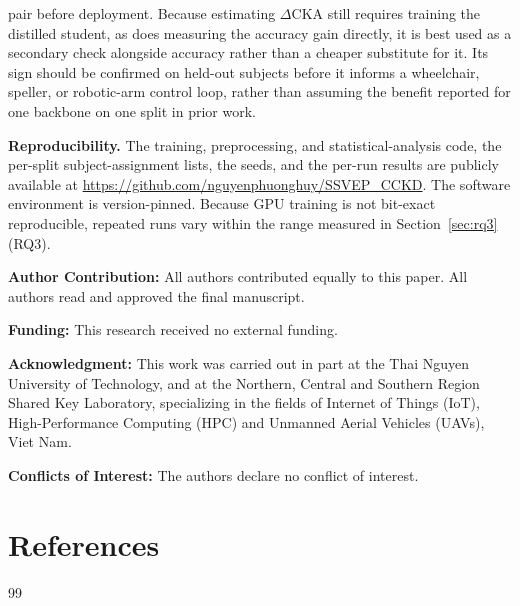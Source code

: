 \documentclass[11pt,a4paper,twoside,asymmetric]{article}
\begin{document}
pair before deployment. Because estimating $\Delta$CKA still requires training the distilled student, as does measuring the accuracy gain directly, it is best used as a secondary check alongside accuracy rather than a cheaper substitute for it. Its sign should be confirmed on held-out subjects before it informs a wheelchair, speller, or robotic-arm control loop, rather than assuming the benefit reported for one backbone on one split in prior work.

\begin{sloppypar}
\noindent \textbf{Reproducibility.} The training, preprocessing, and statistical-analysis code, the per-split subject-assignment lists, the seeds, and the per-run results are publicly available at \url{https://github.com/nguyenphuonghuy/SSVEP_CCKD}. The software environment is version-pinned. Because GPU training is not bit-exact reproducible, repeated runs vary within the range measured in Section~\ref{sec:rq3} (RQ3).
\end{sloppypar}

\noindent \textbf{Author Contribution:} All authors contributed equally to this paper. All authors read and approved the final manuscript.

\noindent \textbf{Funding:} This research received no external funding.

\noindent \textbf{Acknowledgment:} This work was carried out in part at the Thai Nguyen University of Technology, and at the Northern, Central and Southern Region Shared Key Laboratory, specializing in the fields of Internet of Things (IoT), High-Performance Computing (HPC) and Unmanned Aerial Vehicles (UAVs), Viet Nam.

\noindent \textbf{Conflicts of Interest:} The authors declare no conflict of interest.

\section*{References}
\small{
\begin{thebibliography}{99}
\itemsep 0pt

\end{thebibliography}
}
\end{document}
